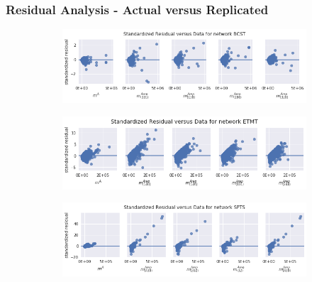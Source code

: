 \documentclass{beamer}
\begin{document}
\begin{frame}
\frametitle{Residual Analysis - Actual versus Replicated}
    \begin{figure}[!h]
      \begin{subfigure}[b]{.75\textwidth}
        \centering
        \includegraphics[scale=0.33]{BCST_res}
      \end{subfigure}
      \begin{subfigure}[b]{.75\textwidth}
        \centering
        \includegraphics[scale=0.33]{ETMT_res}
      \end{subfigure}
      \begin{subfigure}[b]{.75\textwidth}
        \centering
        \includegraphics[scale=0.33]{SPTS_res}
      \end{subfigure}
    \end{figure}
\end{frame}
\end{document}
